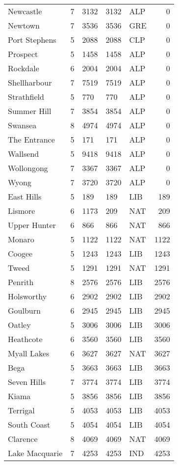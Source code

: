 \documentclass{article}
\begin{document}
\begin{center}
\begin{longtable}{lllllr}
Newcastle & 7 & 3132 & 3132 & ALP & 0\\
Newtown & 7 & 3536 & 3536 & GRE & 0\\
Port Stephens & 5 & 2088 & 2088 & CLP & 0\\
Prospect & 5 & 1458 & 1458 & ALP & 0\\
Rockdale & 6 & 2004 & 2004 & ALP & 0\\
Shellharbour & 7 & 7519 & 7519 & ALP & 0\\
Strathfield & 5 & 770 & 770 & ALP & 0\\
Summer Hill & 7 & 3854 & 3854 & ALP & 0\\
Swansea & 8 & 4974 & 4974 & ALP & 0\\
The Entrance & 5 & 171 & 171 & ALP & 0\\
Wallsend & 5 & 9418 & 9418 & ALP & 0\\
Wollongong & 7 & 3367 & 3367 & ALP & 0\\
Wyong & 7 & 3720 & 3720 & ALP & 0\\
\hline \hline
East Hills & 5 & 189 & 189 & LIB & 189\\
Lismore & 6 & 1173 & 209 & NAT & 209\\
Upper Hunter & 6 & 866 & 866 & NAT & 866\\
Monaro & 5 & 1122 & 1122 & NAT & 1122\\
Coogee & 5 & 1243 & 1243 & LIB & 1243\\
Tweed & 5 & 1291 & 1291 & NAT & 1291\\
Penrith & 8 & 2576 & 2576 & LIB & 2576\\
Holsworthy & 6 & 2902 & 2902 & LIB & 2902\\
Goulburn & 6 & 2945 & 2945 & LIB & 2945\\
Oatley & 5 & 3006 & 3006 & LIB & 3006\\
\hline \hline
Heathcote & 6 & 3560 & 3560 & LIB & 3560\\
Myall Lakes & 6 & 3627 & 3627 & NAT & 3627\\
Bega & 5 & 3663 & 3663 & LIB & 3663\\
Seven Hills & 7 & 3774 & 3774 & LIB & 3774\\
Kiama & 5 & 3856 & 3856 & LIB & 3856\\
Terrigal & 5 & 4053 & 4053 & LIB & 4053\\
South Coast & 5 & 4054 & 4054 & LIB & 4054\\
Clarence & 8 & 4069 & 4069 & NAT & 4069\\
Lake Macquarie & 7 & 4253 & 4253 & IND & 4253\\

\end{longtable}
\end{center}
\end{document}
